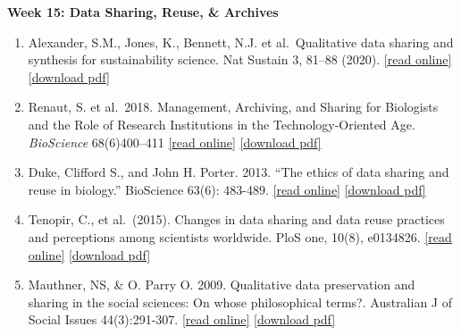 \documentclass[
  12pt,
]{article}
\begin{document}
\textbf{Week 15: Data Sharing, Reuse, \& Archives}

\begin{enumerate}
\def\labelenumi{\arabic{enumi}.}
\item
  Alexander, S.M., Jones, K., Bennett, N.J. et al.~Qualitative data
  sharing and synthesis for sustainability science. Nat Sustain 3,
  81--88 (2020).
  \href{https://doi.org/10.1038/s41893-019-0434-8}{{[}read online{]}}
  \href{https://github.com/BrunaLab/LAS6292_DataManagement/blob/master/Assigned_Readings/Alexander_etal_2019_NatureSustainability.pdf}{{[}download
  pdf{]}}
\item
  Renaut, S. et al.~2018. Management, Archiving, and Sharing for
  Biologists and the Role of Research Institutions in the
  Technology-Oriented Age. \emph{BioScience} 68(6)400--411
  \href{https://academic.oup.com/bioscience/article/68/6/400/4983937}{{[}read
  online{]}}
  \href{https://github.com/BrunaLab/LAS6292_DataManagement/blob/master/Assigned_Readings/Renaut_etal_2018_Bioscience.pdf}{{[}download
  pdf{]}}
\item
  Duke, Clifford S., and John H. Porter. 2013. ``The ethics of data
  sharing and reuse in biology.'' BioScience 63(6): 483-489.
  \href{https://academic.oup.com/bioscience/article/63/6/483/226339}{{[}read
  online{]}}
  \href{https://github.com/BrunaLab/LAS6292_DataManagement/blob/master/Assigned_Readings/Duke\%26Porter_2013.pdf}{{[}download
  pdf{]}}
\item
  Tenopir, C., et al.~(2015). Changes in data sharing and data reuse
  practices and perceptions among scientists worldwide. PloS one, 10(8),
  e0134826.
  \href{https://journals.plos.org/plosone/article?id=10.1371/journal.pone.0134826}{{[}read
  online{]}}
  \href{https://github.com/BrunaLab/LAS6292_DataManagement/blob/master/Assigned_Readings/Tenopir_etal_2015.PDF}{{[}download
  pdf{]}}
\item
  Mauthner, NS, \& O. Parry O. 2009. Qualitative data preservation and
  sharing in the social sciences: On whose philosophical terms?.
  Australian J of Social Issues 44(3):291-307.
  \href{https://onlinelibrary.wiley.com/doi/abs/10.1002/j.1839-4655.2009.tb00147.x}{{[}read
  online{]}}
  \href{https://github.com/BrunaLab/LAS6292_DataManagement/blob/master/Assigned_Readings/Mauthner_et_al-2009-Australian_Journal_of_Social_Issues.pdf}{{[}download
  pdf{]}}
\end{enumerate}
\end{document}
